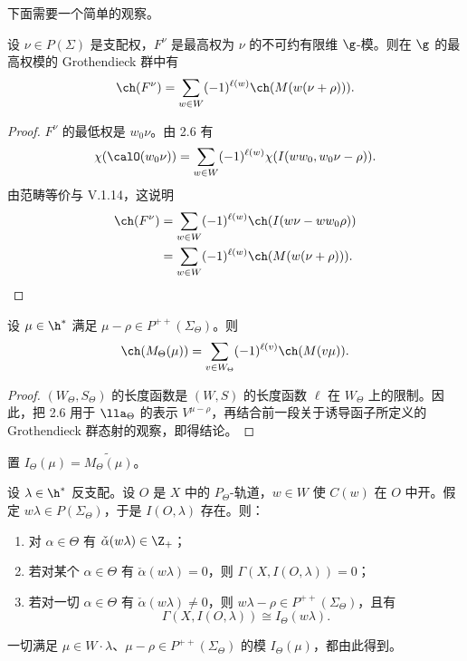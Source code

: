 下面需要一个简单的观察。

\begin{lemma}\label{lem:06.2.8}
设 $\nu\in P(\Sigma)$ 是支配权，$F^\nu$ 是最高权为 $\nu$ 的不可约有限维 $\g$-模。则在 $\g$ 的最高权模的 Grothendieck 群中有
$$\ch(F^\nu)=\sum_{w\in W}(-1)^{\ell(w)}\ch(M(w(\nu+\rho))).$$
\end{lemma}

\begin{proof}
$F^\nu$ 的最低权是 $w_0\nu$。由 2.6 有
$$\chi(\calO(w_0\nu))=\sum_{w\in W}(-1)^{\ell(w)}\chi(I(ww_0,w_0\nu-\rho)).$$
由范畴等价与 V.1.14，这说明
\begin{align*}
\ch(F^\nu)&=\sum_{w\in W}(-1)^{\ell(w)}\ch(I(w\nu-ww_0\rho))\\
&=\sum_{w\in W}(-1)^{\ell(w)}\ch(M(w(\nu+\rho))).
\end{align*}
\end{proof}

\begin{proposition}\label{prop:06.2.9}
设 $\mu\in\h^*$ 满足 $\mu-\rho\in P^{++}(\Sigma_\Theta)$。则
$$\ch(M_\Theta(\mu))=\sum_{v\in W_\Theta}(-1)^{\ell(v)}\ch(M(v\mu)).$$
\end{proposition}

\begin{proof}
$(W_\Theta,S_\Theta)$ 的长度函数是 $(W,S)$ 的长度函数 $\ell$ 在 $W_\Theta$ 上的限制。因此，把 2.6 用于 $\lla_\Theta$ 的表示 $V^{\mu-\rho}$，再结合前一段关于诱导函子所定义的 Grothendieck 群态射的观察，即得结论。
\end{proof}

置 $I_\Theta(\mu)=\widetilde{M_\Theta(\mu)}$。

\begin{theorem}\label{thm:06.2.10}
设 $\lambda\in\h^*$ 反支配。设 $O$ 是 $X$ 中的 $P_\Theta$-轨道，$w\in W$ 使 $C(w)$ 在 $O$ 中开。假定 $w\lambda\in P(\Sigma_\Theta)$，于是 $I(O,\lambda)$ 存在。则：
\begin{enumerate}[label=(\roman*)]
\item 对 $\alpha\in\Theta$ 有 $\check\alpha(w\lambda)\in\Z_+$；
\item 若对某个 $\alpha\in\Theta$ 有 $\check\alpha(w\lambda)=0$，则 $\Gamma(X,I(O,\lambda))=0$；
\item 若对一切 $\alpha\in\Theta$ 有 $\check\alpha(w\lambda)\neq0$，则 $w\lambda-\rho\in P^{++}(\Sigma_\Theta)$，且有
$$\Gamma(X,I(O,\lambda))\cong I_\Theta(w\lambda).$$
\end{enumerate}
一切满足 $\mu\in W\cdot\lambda$、$\mu-\rho\in P^{++}(\Sigma_\Theta)$ 的模 $I_\Theta(\mu)$，都由此得到。
\end{theorem}

